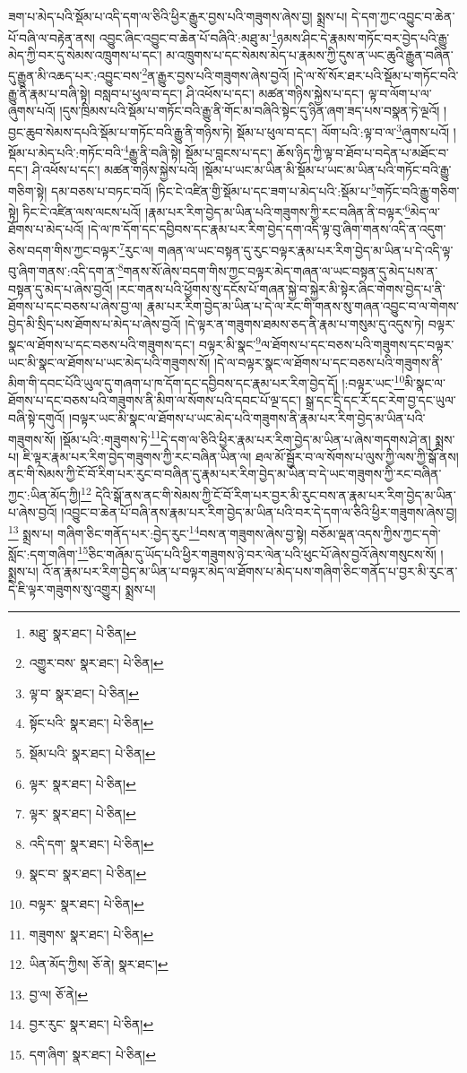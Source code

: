ཟག་པ་མེད་པའི་སྡོམ་པ་འདི་དག་ལ་ཅིའི་ཕྱིར་རྒྱུར་བྱས་པའི་གཟུགས་ཞེས་བྱ། སྨྲས་པ། དེ་དག་ཀྱང་འབྱུང་བ་ཆེན་པོ་བཞི་ལ་བརྟེན་ནས། འབྱུང་ཞིང་འབྱུང་བ་ཆེན་པོ་བཞིའི་:མཐུ་མ་\footnote{མཐུ་  སྣར་ཐང་།  པེ་ཅིན། }ཉམས་ཤིང་དེ་རྣམས་གཏོང་བར་བྱེད་པའི་རྒྱུ་མེད་ཀྱི་བར་དུ་སེམས་འཁྲུགས་པ་དང་། མ་འཁྲུགས་པ་དང་སེམས་མེད་པ་རྣམས་ཀྱི་དུས་ན་ཡང་ཆུའི་རྒྱུན་བཞིན་དུ་རྒྱུན་མི་འཆད་པར་:འབྱུང་བས་\footnote{འགྱུར་བས་  སྣར་ཐང་།  པེ་ཅིན། }ན་རྒྱུར་བྱས་པའི་གཟུགས་ཞེས་བྱའོ། །དེ་ལ་སོ་སོར་ཐར་པའི་སྡོམ་པ་གཏོང་བའི་རྒྱུ་ནི་རྣམ་པ་བཞི་སྟེ། བསླབ་པ་ཕུལ་བ་དང་། ཤི་འཕོས་པ་དང་། མཚན་གཉིས་སྐྱེས་པ་དང་། ལྟ་བ་ལོག་པ་ལ་ཞུགས་པའོ། །དུས་ཁྲིམས་པའི་སྡོམ་པ་གཏོང་བའི་རྒྱུ་ནི་གོང་མ་བཞིའི་སྟེང་དུ་ཉིན་ཞག་ཟད་པས་བསྣན་ཏེ་ལྔའོ། །བྱང་ཆུབ་སེམས་དཔའི་སྡོམ་པ་གཏོང་བའི་རྒྱུ་ནི་གཉིས་ཏེ། སྡོམ་པ་ཕུལ་བ་དང་། ལོག་པའི་:ལྟ་བ་ལ་\footnote{ལྟ་བ་  སྣར་ཐང་།  པེ་ཅིན། }ཞུགས་པའོ། །སྡོམ་པ་མེད་པའི་:གཏོང་བའི་\footnote{སྟོང་པའི་  སྣར་ཐང་།  པེ་ཅིན། }རྒྱུ་ནི་བཞི་སྟེ། སྡོམ་པ་བླངས་པ་དང་། ཆོས་ཉིད་ཀྱི་ལྟ་བ་ཐོབ་པ་བདེན་པ་མཐོང་བ་དང་། ཤི་འཕོས་པ་དང་། མཚན་གཉིས་སྐྱེས་པའོ། །སྡོམ་པ་ཡང་མ་ཡིན་མི་སྡོམ་པ་ཡང་མ་ཡིན་པའི་གཏོང་བའི་རྒྱུ་གཅིག་སྟེ། དམ་བཅས་པ་བཏང་བའོ། །ཏིང་ངེ་འཛིན་གྱི་སྡོམ་པ་དང་ཟག་པ་མེད་པའི་:སྡོམ་པ་\footnote{སྡོམ་པའི་  སྣར་ཐང་།  པེ་ཅིན། }གཏོང་བའི་རྒྱུ་གཅིག་སྟེ། ཏིང་ངེ་འཛིན་ལས་ལངས་པའོ། །རྣམ་པར་རིག་བྱེད་མ་ཡིན་པའི་གཟུགས་ཀྱི་རང་བཞིན་ནི་བལྟར་\footnote{ལྟར་  སྣར་ཐང་།  པེ་ཅིན། }མེད་ལ་ཐོགས་པ་མེད་པའོ། །དེ་ལ་ཁ་དོག་དང་དབྱིབས་དང་རྣམ་པར་རིག་བྱེད་དག་འདི་ལྟ་བུ་ཞིག་གནས་འདི་ན་འདུག་ཅེས་བདག་གིས་ཀྱང་བལྟར་\footnote{ལྟར་  སྣར་ཐང་།  པེ་ཅིན། }རུང་ལ། གཞན་ལ་ཡང་བསྟན་དུ་རུང་བལྟར་རྣམ་པར་རིག་བྱེད་མ་ཡིན་པ་དེ་འདི་ལྟ་བུ་ཞིག་གནས་:འདི་དག་ན་\footnote{འདི་དག་  སྣར་ཐང་།  པེ་ཅིན། }གནས་སོ་ཞེས་བདག་གིས་ཀྱང་བལྟར་མེད་གཞན་ལ་ཡང་བསྟན་དུ་མེད་པས་ན་བསྟན་དུ་མེད་པ་ཞེས་བྱའོ། །རང་གནས་པའི་ཕྱོགས་སུ་དངོས་པོ་གཞན་སྐྱེ་བ་སྐྱེར་མི་སྟེར་ཞིང་གེགས་བྱེད་པ་ནི་ཐོགས་པ་དང་བཅས་པ་ཞེས་བྱ་ལ། རྣམ་པར་རིག་བྱེད་མ་ཡིན་པ་དེ་ལ་རང་གི་གནས་སུ་གཞན་འབྱུང་བ་ལ་གེགས་བྱེད་མི་སྲིད་པས་ཐོགས་པ་མེད་པ་ཞེས་བྱའོ། །དེ་ལྟར་ན་གཟུགས་ཐམས་ཅད་ནི་རྣམ་པ་གསུམ་དུ་འདུས་ཏེ། བལྟར་སྣང་ལ་ཐོགས་པ་དང་བཅས་པའི་གཟུགས་དང་། བལྟར་མི་སྣང་\footnote{སྣང་བ་  སྣར་ཐང་།  པེ་ཅིན། }ལ་ཐོགས་པ་དང་བཅས་པའི་གཟུགས་དང་བལྟར་ཡང་མི་སྣང་ལ་ཐོགས་པ་ཡང་མེད་པའི་གཟུགས་སོ། །དེ་ལ་བལྟར་སྣང་ལ་ཐོགས་པ་དང་བཅས་པའི་གཟུགས་ནི་མིག་གི་དབང་པོའི་ཡུལ་དུ་གཞག་པ་ཁ་དོག་དང་དབྱིབས་དང་རྣམ་པར་རིག་བྱེད་དོ། །:བལྟར་ཡང་\footnote{བལྟར་  སྣར་ཐང་།  པེ་ཅིན། }མི་སྣང་ལ་ཐོགས་པ་དང་བཅས་པའི་གཟུགས་ནི་མིག་ལ་སོགས་པའི་དབང་པོ་ལྔ་དང་། སྒྲ་དང་དྲི་དང་རོ་དང་རེག་བྱ་དང་ཡུལ་བཞི་སྟེ་དགུའོ། །བལྟར་ཡང་མི་སྣང་ལ་ཐོགས་པ་ཡང་མེད་པའི་གཟུགས་ནི་རྣམ་པར་རིག་བྱེད་མ་ཡིན་པའི་གཟུགས་སོ། །སྡོམ་པའི་:གཟུགས་ཏེ་\footnote{གཟུགས་  སྣར་ཐང་།  པེ་ཅིན། }དེ་དག་ལ་ཅིའི་ཕྱིར་རྣམ་པར་རིག་བྱེད་མ་ཡིན་པ་ཞེས་གདགས་ཤེ་ན། སྨྲས་པ། ཇི་ལྟར་རྣམ་པར་རིག་བྱེད་གཟུགས་ཀྱི་རང་བཞིན་ཡིན་ལ། ཐལ་མོ་སྦྱོར་བ་ལ་སོགས་པ་ལུས་ཀྱི་ལས་ཀྱི་སྒོ་ནས། ནང་གི་སེམས་ཀྱི་ངོ་བོ་རིག་པར་རུང་བ་བཞིན་དུ་རྣམ་པར་རིག་བྱེད་མ་ཡིན་བ་དེ་ཡང་གཟུགས་ཀྱི་རང་བཞིན་ཀྱང་:ཡིན་མོད་ཀྱི།\footnote{ཡིན་མོད་ཀྱིས།  ཅོ་ནེ།  སྣར་ཐང་། } དེའི་སྒོ་ནས་ནང་གི་སེམས་ཀྱི་ངོ་བོ་རིག་པར་བྱར་མི་རུང་བས་ན་རྣམ་པར་རིག་བྱེད་མ་ཡིན་པ་ཞེས་བྱའོ། །འབྱུང་བ་ཆེན་པོ་བཞི་ནས་རྣམ་པར་རིག་བྱེད་མ་ཡིན་པའི་བར་དེ་དག་ལ་ཅིའི་ཕྱིར་གཟུགས་ཞེས་བྱ།\footnote{བྱ་ལ།  ཅོ་ནེ། } སྨྲས་པ། གཞིག་ཅིང་གནོད་པར་:བྱེད་རུང་\footnote{བྱར་རུང་  སྣར་ཐང་།  པེ་ཅིན། }བས་ན་གཟུགས་ཞེས་བྱ་སྟེ། བཅོམ་ལྡན་འདས་ཀྱིས་ཀྱང་དགེ་སློང་:དག་གཞིག་\footnote{དག་ཞིག་  སྣར་ཐང་།  པེ་ཅིན། }ཅིང་གཞོམ་དུ་ཡོད་པའི་ཕྱིར་གཟུགས་ཉེ་བར་ལེན་པའི་ཕུང་པོ་ཞེས་བྱའོ་ཞེས་གསུངས་སོ། །སྨྲས་པ། འོ་ན་རྣམ་པར་རིག་བྱེད་མ་ཡིན་པ་བལྟར་མེད་ལ་ཐོགས་པ་མེད་པས་གཞིག་ཅིང་གནོད་པ་བྱར་མི་རུང་ན་དེ་ཇི་ལྟར་གཟུགས་སུ་འགྱུར། སྨྲས་པ། 